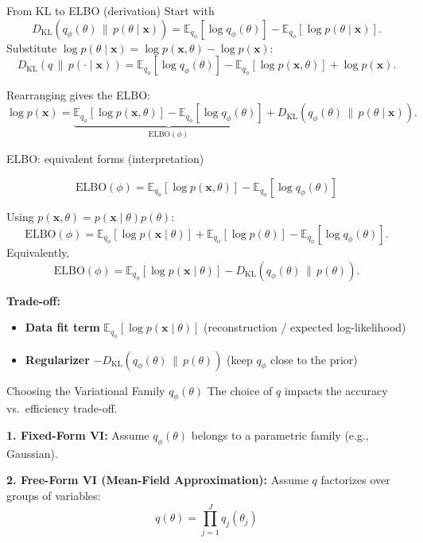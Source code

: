 \documentclass[aspectratio=169]{beamer}
\begin{document}
\begin{frame}{From KL to ELBO (derivation)}
  Start with
  \[
    D_{\mathrm{KL}}\!\left(q_\phi(\theta)\,\|\,p(\theta\mid \bm{x})\right)
    =
    \mathbb{E}_{q_\phi}[\log q_\phi(\theta)]-\mathbb{E}_{q_\phi}[\log p(\theta\mid \bm{x})].
  \]
  Substitute $\log p(\theta\mid \bm{x})=\log p(\bm{x},\theta)-\log p(\bm{x})$:
  \[
    D_{\mathrm{KL}}(q\,\|\,p(\cdot\mid \bm{x}))
    =
    \mathbb{E}_{q_\phi}[\log q_\phi(\theta)]-\mathbb{E}_{q_\phi}[\log p(\bm{x},\theta)]+\log p(\bm{x}).
  \]

  Rearranging gives the ELBO:
  \[
    \log p(\bm{x})
    =
    \underbrace{\mathbb{E}_{q_\phi}[\log p(\bm{x},\theta)]-\mathbb{E}_{q_\phi}[\log q_\phi(\theta)]}_{\mathrm{ELBO}(\phi)}
    +
    D_{\mathrm{KL}}\!\left(q_\phi(\theta)\,\|\,p(\theta\mid \bm{x})\right).
  \]
\end{frame}



\begin{frame}{ELBO: equivalent forms (interpretation)}

  $$\mathrm{ELBO}(\phi) = \mathbb{E}_{q_\phi}[\log p(\bm{x},\theta)]-\mathbb{E}_{q_\phi}[\log q_\phi(\theta)]$$

  Using $p(\bm{x},\theta)=p(\bm{x}\mid \theta)p(\theta)$:
  \[
    \mathrm{ELBO}(\phi)
    =
    \mathbb{E}_{q_\phi}[\log p(\bm{x}\mid \theta)]
    +\mathbb{E}_{q_\phi}[\log p(\theta)]
    -\mathbb{E}_{q_\phi}[\log q_\phi(\theta)].
  \]
  Equivalently,
  \[
    \mathrm{ELBO}(\phi)
    =
    \mathbb{E}_{q_\phi}[\log p(\bm{x}\mid \theta)]
    -
    D_{\mathrm{KL}}\!\left(q_\phi(\theta)\,\|\,p(\theta)\right).
  \]

  \vspace{0.2em}
  \textbf{Trade-off:}
  \begin{itemize}
    \item \textbf{Data fit term} $\mathbb{E}_{q_\phi}[\log p(\bm{x}\mid \theta)]$ (reconstruction / expected log-likelihood)
    \item \textbf{Regularizer} $-D_{\mathrm{KL}}(q_\phi(\theta)\,\|\,p(\theta))$ (keep $q_\phi$ close to the prior)
  \end{itemize}
\end{frame}



\begin{frame}{Choosing the Variational Family $q_\phi(\theta)$}
  The choice of $q$ impacts the accuracy vs.\ efficiency trade-off.

  \vspace{0.3em}
  \textbf{1. Fixed-Form VI:}
  Assume $q_\phi(\theta)$ belongs to a parametric family (e.g., Gaussian).


  \vspace{0.3em}
  \textbf{2. Free-Form VI (Mean-Field Approximation):}
  Assume $q$ factorizes over groups of variables:
  $$ q(\theta) = \prod_{j=1}^{J} q_j(\theta_j) $$

\end{frame}
\end{document}
